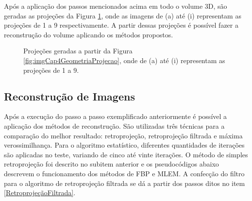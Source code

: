 Após a aplicação dos passos mencionados acima em todo o volume \acs{3D}, são geradas as projeções da Figura \ref{fig:imgCap4Projecoes}, onde as imagens de (a) até (i) representam as projeções de 1 a 9 respectivamente. A partir dessas projeções é possível fazer a reconstrução do volume aplicando os métodos propostos.
 
\begin{figure}[H]
	\centering
	
	\caption{Projeções geradas a partir da Figura \ref{fig:imgCap4GeometriaProjecao}, onde de (a) até (i) representam as projeções de 1 a 9.}
	
	
	\label{fig:imgCap4Projecoes}
\end{figure}

\subsection{Reconstrução de Imagens} 

Após a execução do passo a passo exemplificado anteriormente é possível a aplicação dos métodos de reconstrução. São utilizadas três técnicas para a comparação do melhor resultado: retroprojeção, retroprojeção filtrada e máxima verossimilhança. Para o algoritmo estatístico, diferentes quantidades de iterações são aplicadas no teste, variando de cinco até vinte iterações. O método de simples retroprojeção foi descrito no subitem anterior e os pseudocódigos abaixo descrevem o funcionamento dos métodos de \acs{FBP} e \acs{MLEM}. A confecção do filtro para o algoritmo de retroprojeção filtrada se dá a partir dos passos ditos no item \ref{RetroprojeçãoFiltrada}.

